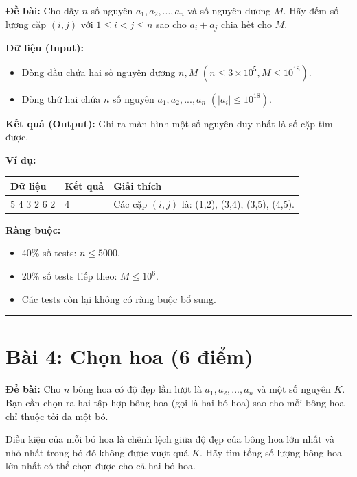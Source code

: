 \documentclass[11pt, a4paper]{article}
\begin{document}
\textbf{Đề bài:}
Cho dãy $n$ số nguyên $a_{1},a_{2},...,a_{n}$ và số nguyên dương $M$. Hãy đếm số lượng cặp $(i,j)$ với $1 \le i < j \le n$ sao cho $a_{i}+a_{j}$ chia hết cho $M$.

\textbf{Dữ liệu (Input):}
\begin{itemize}
    \item Dòng đầu chứa hai số nguyên dương $n, M$ $(n \le 3 \times 10^{5}, M \le 10^{18})$.
    \item Dòng thứ hai chứa $n$ số nguyên $a_{1},a_{2},...,a_{n}$ $(|a_{i}| \le 10^{18})$.
\end{itemize}

\textbf{Kết quả (Output):} Ghi ra màn hình một số nguyên duy nhất là số cặp tìm được.

\textbf{Ví dụ:}
\begin{center}
    \begin{tabularx}{0.9\textwidth}{|p{5cm}|X|X|}
        \hline
        \textbf{Dữ liệu} & \textbf{Kết quả} & \textbf{Giải thích} \\
        \hline
        5 4 \newline 1 3 2 6 2 & 4 & Các cặp $(i,j)$ là: (1,2), (3,4), (3,5), (4,5). \\
        \hline
    \end{tabularx}
\end{center}

\textbf{Ràng buộc:}
\begin{itemize}
    \item 40\% số tests: $n \le 5000$.
    \item 20\% số tests tiếp theo: $M \le 10^{6}$.
    \item Các tests còn lại không có ràng buộc bổ sung.
\end{itemize}

\vspace{0.5cm}
\hrule
\vspace{0.5cm}

\section*{Bài 4: Chọn hoa (6 điểm)}

\textbf{Đề bài:}
Cho $n$ bông hoa có độ đẹp lần lượt là $a_{1},a_{2},...,a_{n}$ và một số nguyên $K$. Bạn cần chọn ra hai tập hợp bông hoa (gọi là hai bó hoa) sao cho mỗi bông hoa chỉ thuộc tối đa một bó.

Điều kiện của mỗi bó hoa là chênh lệch giữa độ đẹp của bông hoa lớn nhất và nhỏ nhất trong bó đó không được vượt quá $K$. Hãy tìm tổng số lượng bông hoa lớn nhất có thể chọn được cho cả hai bó hoa.
\end{document}
